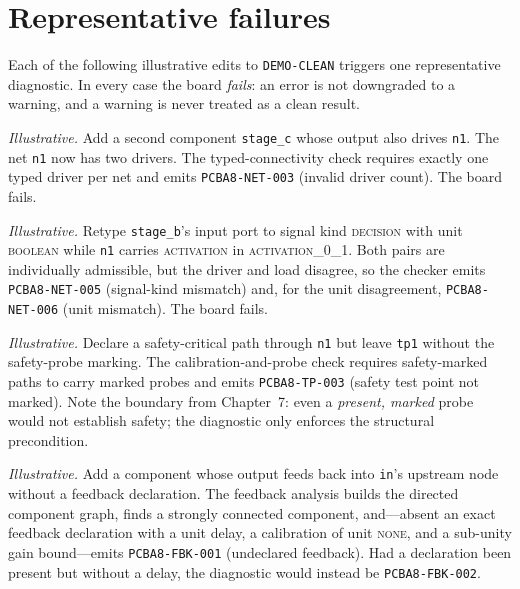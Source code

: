 \section{Representative failures}\label{appB:failures}

Each of the following illustrative edits to \texttt{DEMO-CLEAN} triggers one
representative diagnostic. In every case the board \emph{fails}: an error is not
downgraded to a warning, and a warning is never treated as a clean result.

\begin{example}\label{appB:net003}
\textit{Illustrative.} Add a second component \texttt{stage\_c} whose output also
drives \texttt{n1}. The net \texttt{n1} now has two drivers. The typed-connectivity
check requires exactly one typed driver per net and emits
\texttt{PCBA8-NET-003} (invalid driver count). The board fails.
\end{example}

\begin{example}\label{appB:net056}
\textit{Illustrative.} Retype \texttt{stage\_b}'s input port to signal kind
\textsc{decision} with unit \textsc{boolean} while \texttt{n1} carries
\textsc{activation} in \textsc{activation\_0\_1}. Both pairs are individually
admissible, but the driver and load disagree, so the checker emits
\texttt{PCBA8-NET-005} (signal-kind mismatch) and, for the unit disagreement,
\texttt{PCBA8-NET-006} (unit mismatch). The board fails.
\end{example}

\begin{example}\label{appB:tp003}
\textit{Illustrative.} Declare a safety-critical path through \texttt{n1} but
leave \texttt{tp1} without the safety-probe marking. The calibration-and-probe
check requires safety-marked paths to carry marked probes and emits
\texttt{PCBA8-TP-003} (safety test point not marked). Note the boundary from
Chapter~7: even a \emph{present, marked} probe would not establish safety; the
diagnostic only enforces the structural precondition.
\end{example}

\begin{example}\label{appB:fbk001}
\textit{Illustrative.} Add a component whose output feeds back into \texttt{in}'s
upstream node without a feedback declaration. The feedback analysis builds the
directed component graph, finds a strongly connected component, and---absent an
exact feedback declaration with a unit delay, a calibration of unit \textsc{none},
and a sub-unity gain bound---emits \texttt{PCBA8-FBK-001} (undeclared feedback). Had a
declaration been present but without a delay, the diagnostic would instead be
\texttt{PCBA8-FBK-002}.
\end{example}

